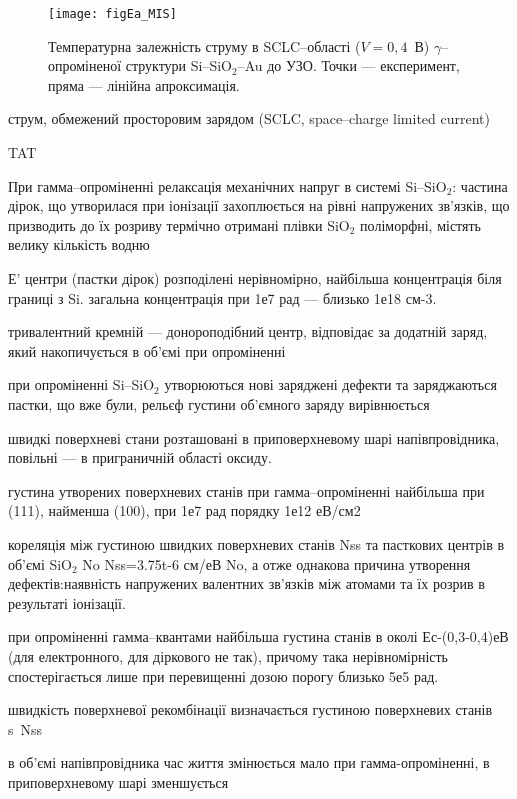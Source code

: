 \documentclass[a4paper,14pt,oneside,openany]{memoir}
\begin{document}
\begin{figure}
\center
\texttt{[image: figEa\_MIS]}%
\caption{\label{figEa_MIS}
Температурна залежність струму в SCLC--області  ($V=0,4$~В)
$\gamma$--опроміненої структури Si--SiO$_2$--Au до УЗО.
Точки --- експеримент,
пряма --- лінійна апроксимація.
}%
\end{figure}


струм, обмежений  просторовим зарядом (SCLC, space--charge limited current)


TAT \cite{TAT:Gilmore,TAT:GopalSST,TAT:Gopal}


\cite{PersenkovBook}
При гамма--опроміненні релаксація механічних напруг в системі Si--SiO$_2$:
частина дірок, що утворилася при іонізації захоплюється на рівні напружених зв'язків, що призводить до їх розриву
термічно отримані плівки SiO$_2$ поліморфні,
містять велику кількість водню

Е' центри (пастки дірок) розподілені нерівномірно, найбільша концентрація біля границі з Si.
загальна концентрація при 1е7 рад ---  близько 1е18 см-3.

тривалентний кремній --- донороподібний центр,
відповідає за додатній заряд, який накопичується в об'ємі при опроміненні

при опроміненні Si--SiO$_2$ утворюються нові заряджені дефекти та заряджаються пастки,
що вже були,
рельєф густини об'ємного заряду вирівнюється

швидкі поверхневі стани розташовані в приповерхневому шарі напівпровідника,
повільні --- в приграничній області оксиду.

густина утворених поверхневих станів при гамма--опроміненні найбільша при (111), найменша (100),
при 1е7 рад порядку 1е12 еВ/см2

кореляція між густиною швидких поверхневих станів Nss та пасткових центрів в об'ємі SiO$_2$ No
Nss=3.75t-6 см/еВ No,
а отже однакова причина утворення дефектів:наявність напружених валентних зв'язків між атомами та їх розрив в результаті іонізації.

при опроміненні гамма--квантами найбільша густина станів в околі Ес-(0,3-0,4)еВ (для електронного, для діркового не так),
причому така нерівномірність спостерігається лише при перевищенні дозою порогу близько 5е5 рад.

швидкість поверхневої рекомбінації визначається густиною поверхневих станів
s~Nss

в об'ємі напівпровідника час життя змінюється мало при гамма-опроміненні, в приповерхневому шарі зменшується
\end{document}
